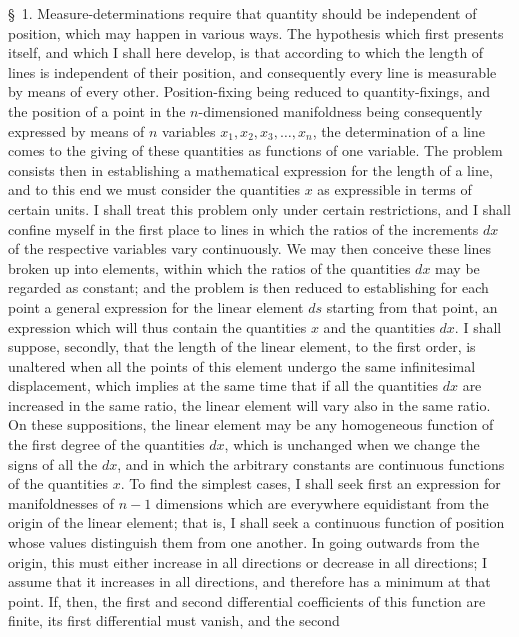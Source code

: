 \documentclass[a4paper,12pt]{article}
\begin{document}
\S~1.
Measure-determinations require that quantity should be
independent of position, which may happen in various ways.  The
hypothesis which first presents itself, and which I shall here
develop, is that according to which the length of lines is
independent of their position, and consequently every line is
measurable by means of every other.  Position-fixing being
reduced to quantity-fixings, and the position of a point in the
$n$-dimensioned manifoldness being consequently expressed by
means of $n$ variables
$x_1, x_2, x_3,\ldots, x_n$,
the determination of a line comes to the giving of these
quantities as functions of one variable.  The problem consists
then in establishing a mathematical expression for the length of
a line, and to this end we must consider the quantities $x$ as
expressible in terms of certain units.  I shall treat this
problem only under certain restrictions, and I shall confine
myself in the first place to lines in which the ratios of the
increments $dx$ of the respective variables vary continuously.
We may then conceive these lines broken up into elements, within
which the ratios of the quantities $dx$ may be regarded as
constant; and the problem is then reduced to establishing for
each point a general expression for the linear element $ds$
starting from that point, an expression which will thus contain
the quantities $x$ and the quantities $dx$.  I shall suppose,
secondly, that the length of the linear element, to the first
order, is unaltered when all the points of this element undergo
the same infinitesimal displacement, which implies at the
same time that if all the quantities $dx$ are increased in the
same ratio, the linear element will vary also in the same ratio.
On these suppositions, the linear element may be any homogeneous
function of the first degree of the quantities $dx$, which is
unchanged when we change the signs of all the $dx$, and in which
the arbitrary constants are continuous functions of the
quantities $x$.  To find the simplest cases, I shall seek first
an expression for manifoldnesses of $n - 1$ dimensions which are
everywhere equidistant from the origin of the linear element;
that is, I shall seek a continuous function of position whose
values distinguish them from one another.  In going outwards from
the origin, this must either increase in all directions or
decrease in all directions; I assume that it increases in all
directions, and therefore has a minimum at that point.  If, then,
the first and second differential coefficients of this function
are finite, its first differential must vanish, and the second
\end{document}
